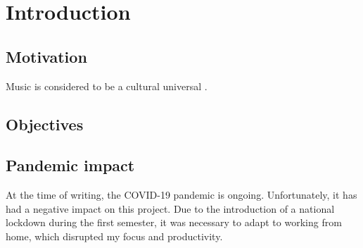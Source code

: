 \documentclass[../../report.tex]{subfiles}
\begin{document}
\chapter{Introduction}

\section{Motivation}
Music is considered to be a cultural universal \cite{Mehreaax0868}.

\section{Objectives}
\section{Pandemic impact}
At the time of writing, the COVID-19 pandemic is ongoing. Unfortunately, it has had a negative impact on this project. Due to the introduction of a national lockdown during the first semester, it was necessary to adapt to working from home, which disrupted my focus and productivity.
\end{document}
